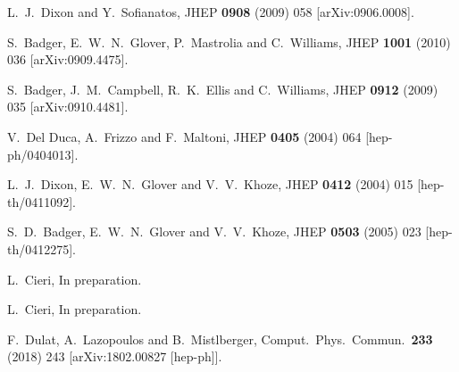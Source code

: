 \documentclass[12pt]{article}
\begin{document}
\begin{thebibliography}{99}
  L.~J.~Dixon and Y.~Sofianatos,
  JHEP {\bf 0908} (2009) 058
   [arXiv:0906.0008].


  S.~Badger, E.~W.~N.~Glover, P.~Mastrolia and C.~Williams,
  JHEP {\bf 1001} (2010) 036
   [arXiv:0909.4475].


  S.~Badger, J.~M.~Campbell, R.~K.~Ellis and C.~Williams,
  JHEP {\bf 0912} (2009) 035
  [arXiv:0910.4481].



  V.~Del Duca, A.~Frizzo and F.~Maltoni,
  JHEP {\bf 0405} (2004) 064
  [hep-ph/0404013].

  L.~J.~Dixon, E.~W.~N.~Glover and V.~V.~Khoze,
  JHEP {\bf 0412} (2004) 015
  [hep-th/0411092].


  S.~D.~Badger, E.~W.~N.~Glover and V.~V.~Khoze,
  JHEP {\bf 0503} (2005) 023
  [hep-th/0412275].


L.~Cieri, In preparation. 


L.~Cieri, In preparation. 

  F.~Dulat, A.~Lazopoulos and B.~Mistlberger,
  Comput.\ Phys.\ Commun.\  {\bf 233} (2018) 243
  [arXiv:1802.00827 [hep-ph]].
  


\end{thebibliography}
\end{document}
